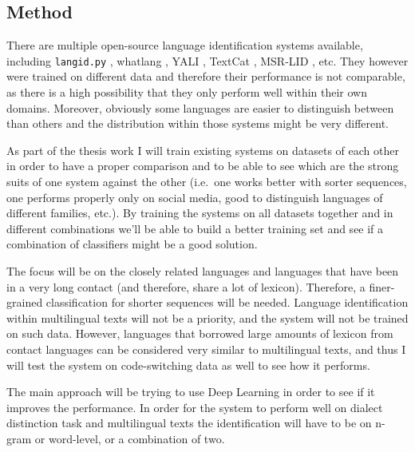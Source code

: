 \subsection{Method}

There are multiple open-source language identification systems available, including \texttt{langid.py} \parencite{lui2012langid}, whatlang \parencite{brown2013selecting}, YALI \parencite{majlivs2012yet}, TextCat \parencite{cavnar1994n}, MSR-LID \parencite{goldszmidt2013boot}, etc. They however were trained on different data and therefore their performance is not comparable, as there is a high possibility that they only perform well within their own domains. Moreover, obviously some languages are easier to distinguish between than others and the distribution within those systems might be very different.


As part of the thesis work I will train existing systems on datasets of each other in order to have a proper comparison and to be able to see which are the strong suits of one system against the other (i.e.\ one works better with sorter sequences, one performs properly only on social media, good to distinguish languages of different families, etc.). By training the systems on all datasets together and in different combinations we'll be able to build a better training set and see if a combination of classifiers might be a good solution.

The focus will be on the closely related languages and languages that have been in a very long contact (and therefore, share a lot of lexicon). Therefore, a finer-grained classification for shorter sequences will be needed. Language identification within multilingual texts will not be a priority, and the system will not be trained on such data. However, languages that borrowed large amounts of lexicon from contact languages can be considered very similar to multilingual texts, and thus I will test the system on code-switching data as well to see how it performs. 

The main approach will be trying to use Deep Learning in order to see if it improves the performance. 
In order for the system to perform well on dialect distinction task and multilingual texts the identification will have to be on n-gram or word-level, or a combination of two. 

